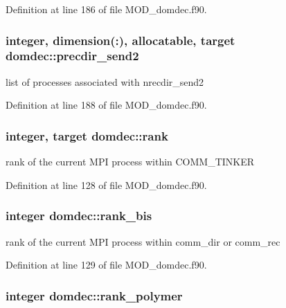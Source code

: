 Definition at line 186 of file M\-O\-D\-\_\-domdec.\-f90.

\hypertarget{classdomdec_a44484ba004f950136be30521a36c5946}{
\subsubsection[{precdir\-\_\-send2}]{\setlength{\rightskip}{0pt plus 5cm}integer, dimension(\-:), allocatable, target domdec\-::precdir\-\_\-send2}}\label{classdomdec_a44484ba004f950136be30521a36c5946}


list of processes associated with nrecdir\-\_\-send2 



Definition at line 188 of file M\-O\-D\-\_\-domdec.\-f90.

\hypertarget{classdomdec_a146ec15c8422fd2670da75c3e0e0dfe9}{
\subsubsection[{rank}]{\setlength{\rightskip}{0pt plus 5cm}integer, target domdec\-::rank}}\label{classdomdec_a146ec15c8422fd2670da75c3e0e0dfe9}


rank of the current M\-P\-I process within C\-O\-M\-M\-\_\-\-T\-I\-N\-K\-E\-R 



Definition at line 128 of file M\-O\-D\-\_\-domdec.\-f90.

\hypertarget{classdomdec_aebba4360c9e42de2ed494d4167a63a99}{
\subsubsection[{rank\-\_\-bis}]{\setlength{\rightskip}{0pt plus 5cm}integer domdec\-::rank\-\_\-bis}}\label{classdomdec_aebba4360c9e42de2ed494d4167a63a99}


rank of the current M\-P\-I process within comm\-\_\-dir or comm\-\_\-rec 



Definition at line 129 of file M\-O\-D\-\_\-domdec.\-f90.

\hypertarget{classdomdec_aa41e5fcea13c9f7a65a84836b19537ff}{
\subsubsection[{rank\-\_\-polymer}]{\setlength{\rightskip}{0pt plus 5cm}integer domdec\-::rank\-\_\-polymer}}\label{classdomdec_aa41e5fcea13c9f7a65a84836b19537ff}


